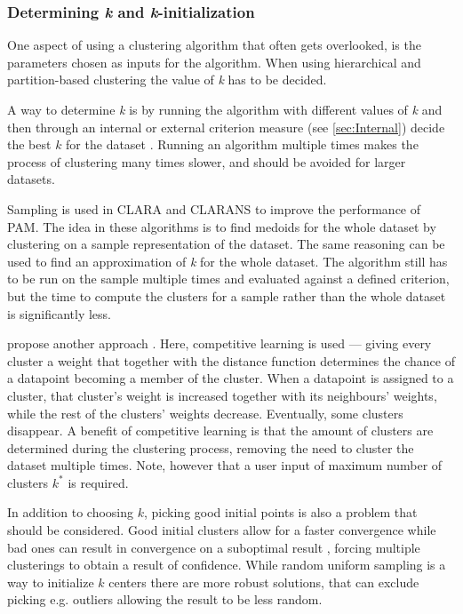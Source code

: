 \documentclass[../report.tex]{subfiles}
\begin{document}
\subsubsection{Determining \textit{k} and \textit{k}-initialization}
One aspect of using a clustering algorithm that often gets overlooked, is the parameters chosen as inputs for the algorithm.
When using hierarchical and partition-based clustering the value of \textit{k} has to be decided.

A way to determine \textit{k} is by running the algorithm with different values of \textit{k} and then through an internal or external criterion measure (see \cref{sec:Internal}) decide the best $k$ for the dataset \cite{Huang97clusteringlarge, Sugar2003}. Running an algorithm multiple times makes the process of clustering many times slower, and should be avoided for larger datasets.

Sampling is used in CLARA and CLARANS \cite{Ng2002} to improve the performance of PAM. The idea in these algorithms is to find medoids for the whole dataset by clustering on a sample representation of the dataset. The same reasoning can be used to find an approximation of \textit{k} for the whole dataset. The algorithm still has to be run on the sample multiple times and evaluated against a defined criterion, but the time to compute the clusters for a sample rather than the whole dataset is significantly less.

\citeauthor{Cheung2013} propose another approach \cite{Cheung2013, Jia2018}. Here, competitive learning is used --- giving every cluster a weight that together with the distance function determines the chance of a datapoint becoming a member of the cluster. When a datapoint is assigned to a cluster, that cluster's weight is increased together with its neighbours' weights, while the rest of the clusters' weights decrease. Eventually, some clusters disappear. A benefit of competitive learning is that the amount of clusters are determined during the clustering process, removing the need to cluster the dataset multiple times. Note, however that a user input of maximum number of clusters $\mathit{k^*}$ is required.

In addition to choosing $k$, picking good initial points is also a problem that should be considered. Good initial clusters allow for a faster convergence while bad ones can result in convergence on a suboptimal result \cite{Arthur2006, Jia2018}, forcing multiple clusterings to obtain a result of confidence. While random uniform sampling is a way to initialize $k$ centers there are more robust solutions, that can exclude picking e.g. outliers allowing the result to be less random.
\end{document}

